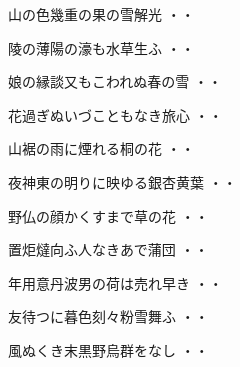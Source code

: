 \begin{shiika}山の色幾重の果の雪解光
\hfill{・・}\end{shiika}
\vspace{0.6cm}
\begin{shiika}陵の薄陽の濠も水草生ふ
\hfill{・・}\end{shiika}
\vspace{0.6cm}
\begin{shiika}娘の縁談又もこわれぬ春の雪
\hfill{・・}\end{shiika}
\vspace{0.6cm}
\begin{shiika}花過ぎぬいづこともなき旅心
\hfill{・・}\end{shiika}
\vspace{0.6cm}
\begin{shiika}山裾の雨に煙れる桐の花
\hfill{・・}\end{shiika}
\vspace{0.6cm}
\begin{shiika}夜神東の明りに映ゆる銀杏黄葉
\hfill{・・}\end{shiika}
\vspace{0.6cm}
\begin{shiika}野仏の顔かくすまで草の花
\hfill{・・}\end{shiika}
\vspace{0.6cm}
\begin{shiika}置炬燵向ふ人なきあで蒲団
\hfill{・・}\end{shiika}
\vspace{0.6cm}
\begin{shiika}年用意丹波男の荷は売れ早き
\hfill{・・}\end{shiika}
\vspace{0.6cm}
\begin{shiika}友待つに暮色刻々粉雪舞ふ
\hfill{・・}\end{shiika}
\vspace{0.6cm}
\begin{shiika}風ぬくき末黒野烏群をなし
\hfill{・・}\end{shiika}
\vspace{0.6cm}
